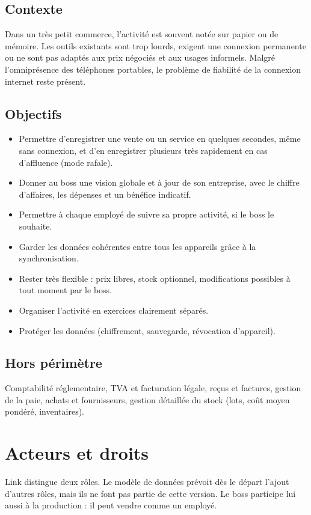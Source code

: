 \documentclass[11pt,a4paper]{article}
\begin{document}
	\subsection{Contexte}
	Dans un très petit commerce, l'activité est souvent notée sur papier ou de mémoire. Les outils existants sont trop lourds, exigent une connexion permanente ou ne sont pas adaptés aux prix négociés et aux usages informels. Malgré l'omniprésence des téléphones portables, le problème de fiabilité de la connexion internet reste présent.
	
	\subsection{Objectifs}
	\begin{itemize}[leftmargin=*]
		\item Permettre d'enregistrer une vente ou un service en quelques secondes, même sans connexion, et d'en enregistrer plusieurs très rapidement en cas d'affluence (mode rafale).
		\item Donner au boss une vision globale et à jour de son entreprise, avec le chiffre d'affaires, les dépenses et un bénéfice indicatif.
		\item Permettre à chaque employé de suivre sa propre activité, si le boss le souhaite.
		\item Garder les données cohérentes entre tous les appareils grâce à la synchronisation.
		\item Rester très flexible : prix libres, stock optionnel, modifications possibles à tout moment par le boss.
		\item Organiser l'activité en exercices clairement séparés.
		\item Protéger les données (chiffrement, sauvegarde, révocation d'appareil).
	\end{itemize}
	
	\subsection{Hors périmètre}
	Comptabilité réglementaire, TVA et facturation légale, reçus et factures, gestion de la paie, achats et fournisseurs, gestion détaillée du stock (lots, coût moyen pondéré, inventaires).
	
	\section{Acteurs et droits}
	Link distingue deux rôles. Le modèle de données prévoit dès le départ l'ajout d'autres rôles, mais ils ne font pas partie de cette version. Le boss participe lui aussi à la production : il peut vendre comme un employé.
	
\end{document}
